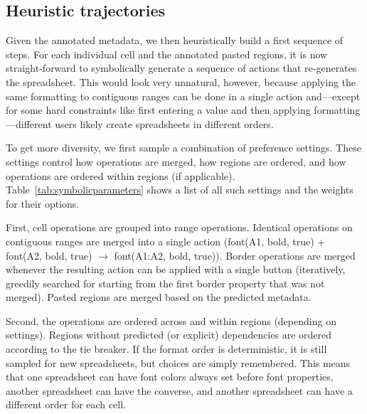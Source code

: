 \documentclass{article}
\theoremstyle{plain}
\theoremstyle{definition}
\theoremstyle{remark}
\begin{document}
\subsection{Heuristic trajectories}\label{ssec:trajectories}

Given the annotated metadata, we then heuristically build a first sequence of steps.
For each individual cell and the annotated pasted regions, it is now straight-forward to symbolically generate a sequence of actions that re-generates the spreadsheet.
This would look very unnatural, however, because applying the same formatting to contiguous ranges can be done in a single action and---except for some hard constraints like first entering a value and then applying formatting---different users likely create spreadsheets in different orders.

To get more diversity, we first sample a combination of preference settings.
These settings control how operations are merged, how regions are ordered, and how operations are ordered within regions (if applicable).
Table~\ref{tab:symbolicparameters} shows a list of all such settings and the weights for their options.

First, cell operations are grouped into range operations.
Identical operations on contiguous ranges are merged into a single action (\textsf{\small font(A1, bold, true) + font(A2, bold, true)} $\rightarrow$ \textsf{\small font(A1:A2, bold, true)}).
Border operations are merged whenever the resulting action can be applied with a single button (iteratively, greedily searched for starting from the first border property that was not merged).
Pasted regions are merged based on the predicted metadata.

Second, the operations are ordered across and within regions (depending on settings).
Regions without predicted (or explicit) dependencies are ordered according to the tie breaker.
If the format order is deterministic, it is still sampled for new spreadsheets, but choices are simply remembered.
This means that one spreadsheet can have font colors always set before font properties, another spreadsheet can have the converse, and another spreadsheet can have a different order for each cell.
\end{document}
